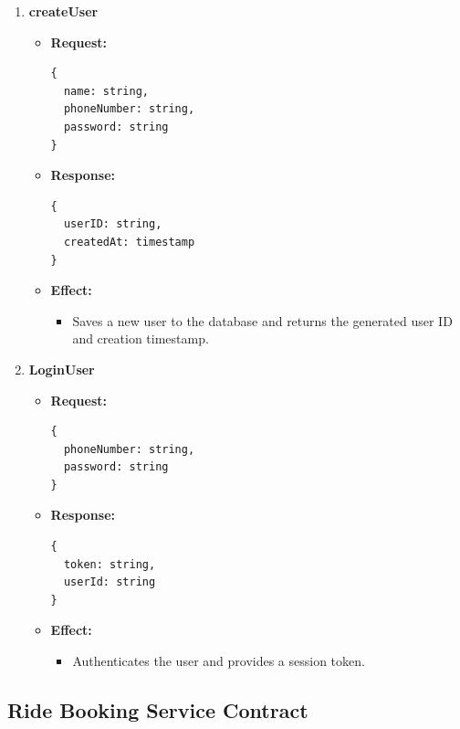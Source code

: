 \documentclass[a4paper,12pt]{article}
\begin{document}
\begin{enumerate}
  \item \textbf{createUser}
    \begin{itemize}
      \item \textbf{Request:}
      \begin{verbatim}
{
  name: string, 
  phoneNumber: string, 
  password: string
}
      \end{verbatim}
      \item \textbf{Response:}
      \begin{verbatim}
{
  userID: string, 
  createdAt: timestamp
}
      \end{verbatim}
      \item \textbf{Effect:}
      \begin{itemize}
        \item Saves a new user to the database and returns the generated user ID and creation timestamp.
      \end{itemize}
    \end{itemize}

  \item \textbf{LoginUser}
    \begin{itemize}
      \item \textbf{Request:}
      \begin{verbatim}
{
  phoneNumber: string, 
  password: string
}
      \end{verbatim}
      \item \textbf{Response:}
      \begin{verbatim}
{
  token: string, 
  userId: string
}
      \end{verbatim}
      \item \textbf{Effect:}
      \begin{itemize}
        \item Authenticates the user and provides a session token.
      \end{itemize}
    \end{itemize}
\end{enumerate}

\subsection*{Ride Booking Service Contract}
\end{document}
